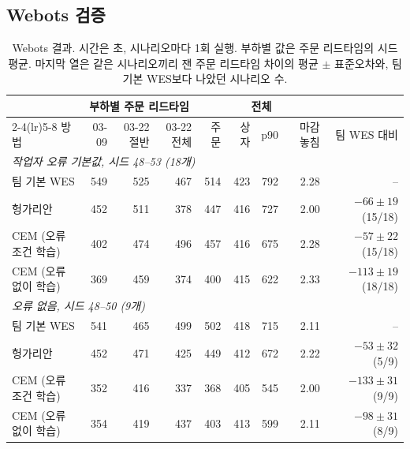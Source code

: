\documentclass[10pt,twocolumn]{article}
\begin{document}
\subsection{Webots 검증}
\label{sec:webots}
\begin{table}[t]
\centering
\caption{Webots 결과. 시간은 초, 시나리오마다 1회 실행. 부하별 값은 주문 리드타임의 시드 평균. 마지막 열은 같은 시나리오끼리 잰 주문 리드타임 차이의 평균 $\pm$ 표준오차와, 팀 기본 WES보다 나았던 시나리오 수.} %
\label{tab:webots}
\small
\begin{tabular}{lrrrrrrrr}
\toprule
 & \multicolumn{3}{c}{부하별 주문 리드타임} & \multicolumn{4}{c}{전체} & \\
\cmidrule(lr){2-4}\cmidrule(lr){5-8}
방법 & 03-09 & 03-22 절반 & 03-22 전체 & 주문 & 상자 & p90 & 마감 놓침 & 팀 WES 대비 \\
\midrule
\multicolumn{9}{l}{\emph{작업자 오류 기본값, 시드 48--53 (18개)}} \\
팀 기본 WES & 549 & 525 & 467 & 514 & 423 & 792 & 2.28 & -- \\
헝가리안 & 452 & 511 & 378 & 447 & 416 & 727 & 2.00 & $-66\pm19$ (15/18) \\
CEM (오류 조건 학습) & 402 & 474 & 496 & 457 & 416 & 675 & 2.28 & $-57\pm22$ (15/18) \\
CEM (오류 없이 학습) & 369 & 459 & 374 & 400 & 415 & 622 & 2.33 & $-113\pm19$ (18/18) \\
\midrule
\multicolumn{9}{l}{\emph{오류 없음, 시드 48--50 (9개)}} \\
팀 기본 WES & 541 & 465 & 499 & 502 & 418 & 715 & 2.11 & -- \\
헝가리안 & 452 & 471 & 425 & 449 & 412 & 672 & 2.22 & $-53\pm32$ (5/9) \\
CEM (오류 조건 학습) & 352 & 416 & 337 & 368 & 405 & 545 & 2.00 & $-133\pm31$ (9/9) \\
CEM (오류 없이 학습) & 354 & 419 & 437 & 403 & 413 & 599 & 2.11 & $-98\pm31$ (8/9) \\
\bottomrule
\end{tabular}
\end{table}
\end{document}
